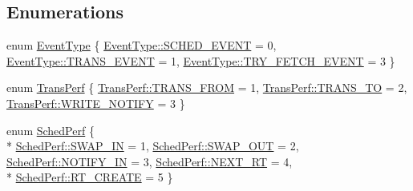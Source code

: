 \subsection*{Enumerations}
\begin{DoxyCompactItemize}
\item 
enum \hyperlink{namespaceapollo_1_1cyber_1_1event_a0cd41779063293aaaa1f6afb60b75a01}{Event\-Type} \{ \hyperlink{namespaceapollo_1_1cyber_1_1event_a0cd41779063293aaaa1f6afb60b75a01a4b6692296d69168ca43e4fc2ff6c187a}{Event\-Type\-::\-S\-C\-H\-E\-D\-\_\-\-E\-V\-E\-N\-T} = 0, 
\hyperlink{namespaceapollo_1_1cyber_1_1event_a0cd41779063293aaaa1f6afb60b75a01a71a859106fdc19e2743acead7494eb1e}{Event\-Type\-::\-T\-R\-A\-N\-S\-\_\-\-E\-V\-E\-N\-T} = 1, 
\hyperlink{namespaceapollo_1_1cyber_1_1event_a0cd41779063293aaaa1f6afb60b75a01af5160dfab469cd692313343ce6ab0fd7}{Event\-Type\-::\-T\-R\-Y\-\_\-\-F\-E\-T\-C\-H\-\_\-\-E\-V\-E\-N\-T} = 3
 \}
\item 
enum \hyperlink{namespaceapollo_1_1cyber_1_1event_a2918dc8c778172bc4a921da7fe02ad84}{Trans\-Perf} \{ \hyperlink{namespaceapollo_1_1cyber_1_1event_a2918dc8c778172bc4a921da7fe02ad84a4f8aa3306b40c00e2f3257586cf75bb2}{Trans\-Perf\-::\-T\-R\-A\-N\-S\-\_\-\-F\-R\-O\-M} = 1, 
\hyperlink{namespaceapollo_1_1cyber_1_1event_a2918dc8c778172bc4a921da7fe02ad84a97e075f9c6fef56eb65d989b4a8a4913}{Trans\-Perf\-::\-T\-R\-A\-N\-S\-\_\-\-T\-O} = 2, 
\hyperlink{namespaceapollo_1_1cyber_1_1event_a2918dc8c778172bc4a921da7fe02ad84a97563db5ce3ece3f8c8320f0aafeac66}{Trans\-Perf\-::\-W\-R\-I\-T\-E\-\_\-\-N\-O\-T\-I\-F\-Y} = 3
 \}
\item 
enum \hyperlink{namespaceapollo_1_1cyber_1_1event_ab72445ee0247295d6699d5f251e11b83}{Sched\-Perf} \{ \\*
\hyperlink{namespaceapollo_1_1cyber_1_1event_ab72445ee0247295d6699d5f251e11b83a87b0f4ed1757a6a1036e94af3849de13}{Sched\-Perf\-::\-S\-W\-A\-P\-\_\-\-I\-N} = 1, 
\hyperlink{namespaceapollo_1_1cyber_1_1event_ab72445ee0247295d6699d5f251e11b83ac6f9baaf541ca8b4b7a298529141af5e}{Sched\-Perf\-::\-S\-W\-A\-P\-\_\-\-O\-U\-T} = 2, 
\hyperlink{namespaceapollo_1_1cyber_1_1event_ab72445ee0247295d6699d5f251e11b83afd788afef045537064a378c476616d7e}{Sched\-Perf\-::\-N\-O\-T\-I\-F\-Y\-\_\-\-I\-N} = 3, 
\hyperlink{namespaceapollo_1_1cyber_1_1event_ab72445ee0247295d6699d5f251e11b83a4acb2a89ea05800bf40c280da46bca3d}{Sched\-Perf\-::\-N\-E\-X\-T\-\_\-\-R\-T} = 4, 
\\*
\hyperlink{namespaceapollo_1_1cyber_1_1event_ab72445ee0247295d6699d5f251e11b83a6e0b2f444ee85018399819eb6ba8134b}{Sched\-Perf\-::\-R\-T\-\_\-\-C\-R\-E\-A\-T\-E} = 5
 \}
\end{DoxyCompactItemize}


